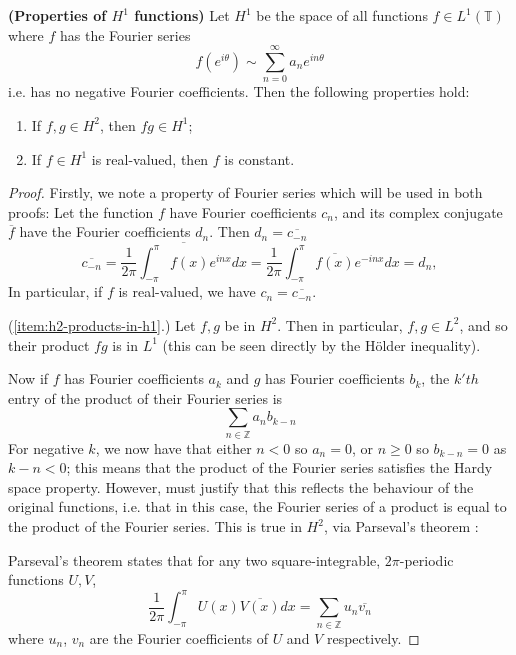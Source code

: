\documentclass[../main.tex]{subfiles}
\begin{document}
\begin{lemma}{\textbf{(Properties of $H^1$ functions)}}
\label{thm:h1-properties}
  Let $H^1$ be the space of all functions $f \in L^1(\mathbb{T})$ where $f$ has
  the Fourier series
  $$f(e^{i \theta}) \sim \sum_{n=0}^\infty a_n e^{i n \theta}$$
  i.e. has no negative Fourier coefficients. Then the following properties hold:
  \begin{enumerate}
    \item\label{item:h2-products-in-h1} If $f, g \in H^2$, then $fg \in H^1$;
    \item\label{item:f-h1-const} If $f \in H^1$ is real-valued, then $f$ is constant.
  \end{enumerate}
\end{lemma}
\begin{proof}
  Firstly, we note a property of Fourier series which will be used in both proofs:
  Let the function $f$ have Fourier coefficients $c_n$, and its complex conjugate
  $\overline{f}$ have the Fourier coefficients $d_n$. Then $d_n = \overline{c_{-n}}$
  \begin{equation}
  \label{eqn:fourier-conjugates}
    \overline{c_{-n}} = \overline{\frac{1}{2\pi} \int_{-\pi}^{\pi}  f(x) e^{inx} dx} 
		    = \frac{1}{2\pi} \int_{-\pi}^{\pi} \overline{f(x)} e^{-inx} dx
        = d_n,
  \end{equation}
  In particular, if $f$ is real-valued, we have $c_n = \overline{c_{-n}}$.

  (\ref{item:h2-products-in-h1}.) Let $f, g$ be in $H^2$. Then in particular, $f,
  g \in L^2$, and so their product $fg$ is in $L^1$ (this can be seen
  directly by the H\"older inequality).

  Now if $f$ has Fourier coefficients $a_k$ and $g$ has Fourier coefficients $b_k$,
  the $k'th$ entry of the product of their Fourier series is
  \begin{equation}
  \label{eqn:prod-fourier-series}
    \sum_{n \in \mathbb{Z}} a_n b_{k-n}
  \end{equation}
  For negative $k$, 
  we now have that either $n < 0$ so $a_n = 0$, or $n \geq 0$ so $b_{k-n} = 0$
  as $k-n < 0$; this means that the product of the Fourier series satisfies
  the Hardy space property. However, must justify that this reflects the behaviour
  of the original functions, i.e. that in this case, the Fourier series of a product
  is equal to the product of the Fourier series. This is true in $H^2$, via
  Parseval's theorem \cite{halmos1982hilbert}:
  
  Parseval's theorem states that for any two square-integrable, $2\pi$-periodic functions $U, V$,
  $$\frac{1}{2\pi} \int_{-\pi}^{\pi} U(x)\overline{V(x)} dx = \sum_{n \in \mathbb{Z}}u_n \overline{v_n}$$
  where $u_n$, $v_n$ are the Fourier coefficients of $U$ and $V$ respectively.


\end{proof}
\end{document}
